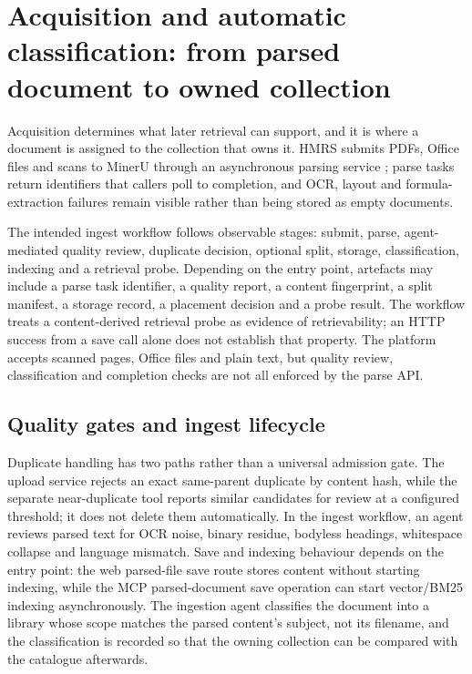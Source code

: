 \section{Acquisition and automatic classification: from parsed document to
owned collection}
\label{sec:acquisition}

Acquisition determines what later retrieval can support, and it is where a
document is assigned to the collection that owns it. HMRS submits PDFs,
Office files and scans to MinerU through an asynchronous parsing service
\citep{mineru}; parse tasks return identifiers that callers poll to completion,
and OCR, layout and formula-extraction failures remain visible rather than
being stored as empty documents.

The intended ingest workflow follows observable stages: submit, parse,
agent-mediated quality review, duplicate decision, optional split, storage,
classification, indexing and a retrieval probe. Depending on the entry point,
artefacts may include a parse task identifier, a quality report, a content
fingerprint, a split manifest, a storage record, a placement decision and a
probe result. The workflow treats a content-derived retrieval probe as evidence
of retrievability; an HTTP success from a save call alone does not establish
that property. The platform accepts scanned pages, Office files and plain
text, but quality review, classification and completion checks are not all
enforced by the parse API.

\subsection{Quality gates and ingest lifecycle}

Duplicate handling has two paths rather than a universal admission gate. The
upload service rejects an exact same-parent duplicate by content hash, while
the separate near-duplicate tool reports similar candidates for review at a
configured threshold; it does not delete them automatically. In the ingest
workflow, an agent reviews parsed text for OCR noise, binary residue, bodyless
headings, whitespace collapse and language mismatch. Save and indexing behaviour
depends on the entry point: the web parsed-file save route stores content
without starting indexing, while the MCP parsed-document save operation can
start vector/BM25 indexing asynchronously. The ingestion agent classifies the document into a library whose scope matches
the parsed content's subject, not its filename, and the classification is
recorded so that the owning collection can be compared with the catalogue
afterwards.

